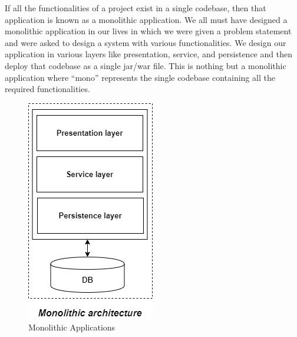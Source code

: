 If all the functionalities of a project exist in a single codebase, then that application is known as a monolithic application. We all must have designed a monolithic application in our lives in which we were given a problem statement and were asked to design a system with various functionalities. We design our application in various layers like presentation, service, and persistence and then deploy that codebase as a single jar/war file. This is nothing but a monolithic application where “mono” represents the single codebase containing all the required functionalities.
\begin{figure}[!ht]
      \center
      \includegraphics[scale=0.60]{assets/monolithic.jpg}
      \caption{Monolithic Applications}
      \label{fig:monoapp}
\end{figure}

